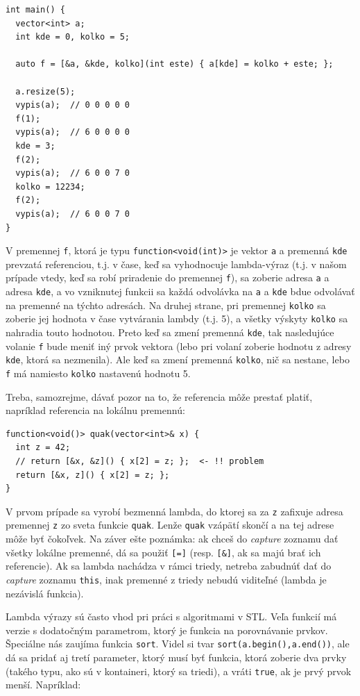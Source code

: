 \documentclass[10pt]{article}
\def\prg{\lstinline}
\def\ods{\vspace*{10pt}}
\begin{document}
{\begin{lstlisting}
int main() {
  vector<int> a;
  int kde = 0, kolko = 5;

  auto f = [&a, &kde, kolko](int este) { a[kde] = kolko + este; };

  a.resize(5);
  vypis(a);  // 0 0 0 0 0
  f(1);
  vypis(a);  // 6 0 0 0 0
  kde = 3;
  f(2);
  vypis(a);  // 6 0 0 7 0
  kolko = 12234;
  f(2);
  vypis(a);  // 6 0 0 7 0
}
\end{lstlisting}

V premennej {\tt f}, ktorá je typu \prg!function<void(int)>! je vektor {\tt a}
a premenná {\tt kde} prevzatá referenciou, t.j. v čase, keď sa vyhodnocuje 
lambda-výraz (t.j. v našom prípade vtedy, keď sa robí priradenie do premennej {\tt f}),
sa zoberie adresa {\tt a} a adresa {\tt kde}, a vo vzniknutej funkcii sa každá
odvolávka na {\tt a} a {\tt kde} bdue odvolávať na premenné na týchto adresách. Na druhej 
strane, pri premennej {\tt kolko} sa zoberie jej hodnota v čase vytvárania lambdy (t.j. 5),
a všetky výskyty {\tt kolko} sa nahradia touto hodnotou. Preto keď sa zmení premenná 
{\tt kde}, tak nasledujúce volanie {\tt f} bude meniť iný prvok vektora (lebo pri volaní
zoberie hodnotu z adresy {\tt kde}, ktorá sa nezmenila). Ale keď sa zmení premenná 
{\tt kolko}, nič sa nestane, lebo {\tt f} má namiesto {\tt kolko} nastavenú hodnotu 5.

\ods
Treba, samozrejme, dávať pozor na to, že referencia môže prestať platiť, napríklad
referencia na lokálnu premennú:

\begin{lstlisting}
function<void()> quak(vector<int>& x) {
  int z = 42;
  // return [&x, &z]() { x[2] = z; };  <- !! problem
  return [&x, z]() { x[2] = z; };
}
\end{lstlisting}

V prvom prípade sa vyrobí bezmenná lambda, do ktorej sa za {\tt z} zafixuje
adresa premennej {\tt z} zo sveta funkcie {\tt quak}. Lenže {\tt quak} vzápätí skončí
a na tej adrese môže byť čokoľvek. Na záver ešte poznámka: ak chceš do {\em capture}
zoznamu dať všetky lokálne premenné, dá sa použiť {\tt[=]} (resp. \prg![&]!, ak 
sa majú brať ich referencie). Ak sa lambda nachádza v rámci triedy, netreba
zabudnúť dať do {\em capture} zoznamu \prg!this!, inak premenné z triedy nebudú
viditeľné (lambda je nezávislá funkcia).

\ods Lambda výrazy sú často vhod pri práci s algoritmami v STL. Veľa funkcií
má verzie s dodatočným parametrom, ktorý je funkcia na porovnávanie prvkov.
Špeciálne nás zaujíma funkcia {\tt sort}. Videl si tvar 
\prg!sort(a.begin(),a.end())!, ale dá sa pridať aj tretí parameter, ktorý musí byť 
funkcia, ktorá zoberie dva prvky (takého typu, ako sú v kontaineri, ktorý sa triedi),
a vráti \prg!true!, ak je prvý prvok menší. Napríklad:

}
\end{document}
